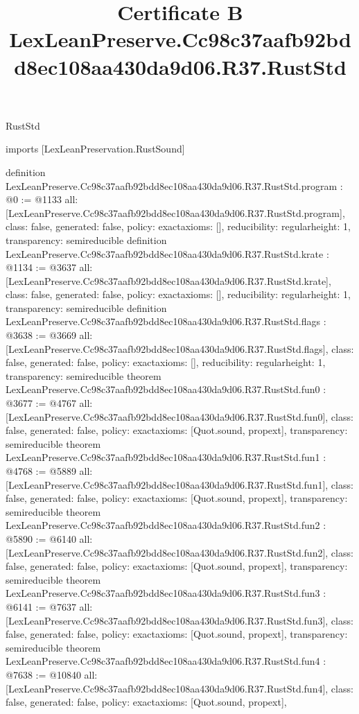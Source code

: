 \begin{lexlean}{RustStd}
\title{Certificate B LexLeanPreserve.Cc98c37aafb92bdd8ec108aa430da9d06.R37.RustStd}
\begin{coremodule}
imports [LexLeanPreservation.RustSound]

definition LexLeanPreserve.Cc98c37aafb92bdd8ec108aa430da9d06.R37.RustStd.program : @0 := @1133 {
  all: [LexLeanPreserve.Cc98c37aafb92bdd8ec108aa430da9d06.R37.RustStd.program],
  class: false,
  generated: false,
  policy: exact{axioms: []},
  reducibility: regular{height: 1},
  transparency: semireducible
}
definition LexLeanPreserve.Cc98c37aafb92bdd8ec108aa430da9d06.R37.RustStd.krate : @1134 := @3637 {
  all: [LexLeanPreserve.Cc98c37aafb92bdd8ec108aa430da9d06.R37.RustStd.krate],
  class: false,
  generated: false,
  policy: exact{axioms: []},
  reducibility: regular{height: 1},
  transparency: semireducible
}
definition LexLeanPreserve.Cc98c37aafb92bdd8ec108aa430da9d06.R37.RustStd.flags : @3638 := @3669 {
  all: [LexLeanPreserve.Cc98c37aafb92bdd8ec108aa430da9d06.R37.RustStd.flags],
  class: false,
  generated: false,
  policy: exact{axioms: []},
  reducibility: regular{height: 1},
  transparency: semireducible
}
theorem LexLeanPreserve.Cc98c37aafb92bdd8ec108aa430da9d06.R37.RustStd.fun0 : @3677 := @4767 {
  all: [LexLeanPreserve.Cc98c37aafb92bdd8ec108aa430da9d06.R37.RustStd.fun0],
  class: false,
  generated: false,
  policy: exact{axioms: [Quot.sound, propext]},
  transparency: semireducible
}
theorem LexLeanPreserve.Cc98c37aafb92bdd8ec108aa430da9d06.R37.RustStd.fun1 : @4768 := @5889 {
  all: [LexLeanPreserve.Cc98c37aafb92bdd8ec108aa430da9d06.R37.RustStd.fun1],
  class: false,
  generated: false,
  policy: exact{axioms: [Quot.sound, propext]},
  transparency: semireducible
}
theorem LexLeanPreserve.Cc98c37aafb92bdd8ec108aa430da9d06.R37.RustStd.fun2 : @5890 := @6140 {
  all: [LexLeanPreserve.Cc98c37aafb92bdd8ec108aa430da9d06.R37.RustStd.fun2],
  class: false,
  generated: false,
  policy: exact{axioms: [Quot.sound, propext]},
  transparency: semireducible
}
theorem LexLeanPreserve.Cc98c37aafb92bdd8ec108aa430da9d06.R37.RustStd.fun3 : @6141 := @7637 {
  all: [LexLeanPreserve.Cc98c37aafb92bdd8ec108aa430da9d06.R37.RustStd.fun3],
  class: false,
  generated: false,
  policy: exact{axioms: [Quot.sound, propext]},
  transparency: semireducible
}
theorem LexLeanPreserve.Cc98c37aafb92bdd8ec108aa430da9d06.R37.RustStd.fun4 : @7638 := @10840 {
  all: [LexLeanPreserve.Cc98c37aafb92bdd8ec108aa430da9d06.R37.RustStd.fun4],
  class: false,
  generated: false,
  policy: exact{axioms: [Quot.sound, propext]},
}
\end{coremodule}
\end{lexlean}
